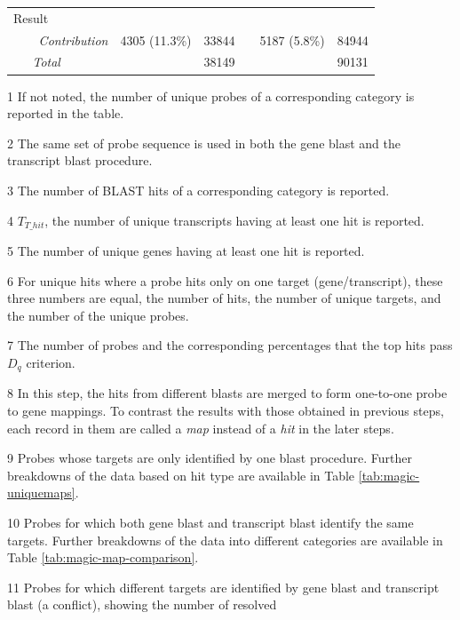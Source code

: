 \begin{table}
\begin{threeparttable}
\begin{footnotesize}
\begin{tabular}{@{}p{3cm}r|rcr|r}
		\multicolumn{6}{l}{Result} \\[.1ex]
	{\it ~~~~Contribution\tnote{13}} & 4305 (11.3\%) & 33844 && 5187 
			(5.8\%) & 84944 \\
	{\it ~~~Total} & \multicolumn{2}{r}{38149} && 		
			\multicolumn{2}{r}{90131} \\
	\bottomrule
	\end{tabular}
	\end{footnotesize}
	\begin{scriptsize}
	\begin{tablenotes}
	\item[1] If not noted, the number of unique probes of a corresponding 
		category is reported in the table.
	\item[2] The same set of probe sequence is used in both the gene blast and 	
		the transcript blast procedure.
	\item[3] The number of BLAST hits of a corresponding category is reported.
	\item[4] $T_{T\_hit}$, the number of unique transcripts having at least one 
		hit is reported.
	\item[5] The number of unique genes having at least one hit is reported.
	\item[6] For unique hits where a probe hits only on one target 
		(gene/transcript), these three numbers are equal, the number of hits, 
		the number of unique targets, and the number of the unique probes.
	\item[7] The number of probes and the corresponding percentages that the 
		top hits pass $D_q$ criterion.
	\item[8] In this step, the hits from different blasts are merged to form 
		one-to-one probe to gene mappings. To contrast the results with those
		obtained in previous steps, each record in them are called a 
		\textit{map} instead of a \textit{hit} in the later steps.
	\item[9] Probes whose targets are only identified by one blast procedure.  
		Further breakdowns of the data based on hit type are available in Table 
		\ref{tab:magic-uniquemaps}.
	\item[10] Probes for which both gene blast and transcript blast identify the
	 	same targets.  Further breakdowns of the data into different 
	 	categories are available in Table \ref{tab:magic-map-comparison}.
	\item[11] Probes for which different targets are identified by gene blast 
		and transcript blast (a conflict), showing the number of resolved 

\end{tablenotes}
\end{scriptsize}
\end{threeparttable}
\end{table}
